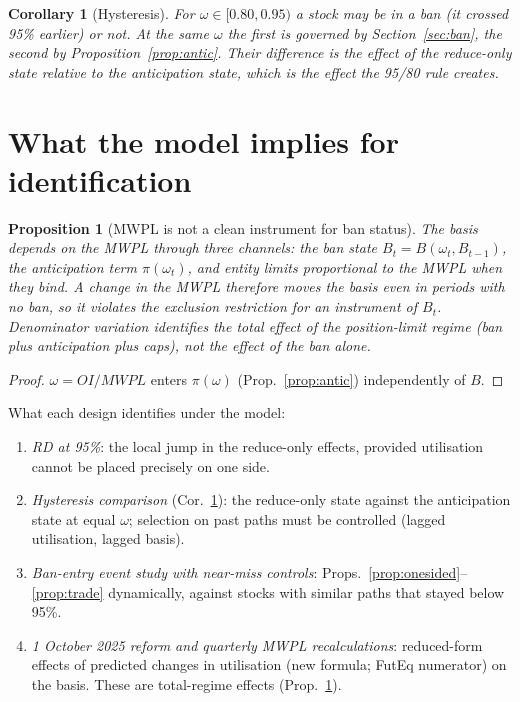 \documentclass[11pt,a4paper]{article}
\theoremstyle{plain}
\newtheorem{proposition}{Proposition}
\newtheorem{corollary}{Corollary}
\theoremstyle{definition}
\theoremstyle{remark}
\begin{document}
\begin{corollary}[Hysteresis]\label{cor:hyst}
For $\omega\in[0.80,0.95)$ a stock may be in a ban (it crossed 95\% earlier) or not. At the same $\omega$ the first is
governed by Section~\ref{sec:ban}, the second by Proposition~\ref{prop:antic}. Their difference is the effect of the
reduce-only state relative to the anticipation state, which is the effect the 95/80 rule creates.
\end{corollary}

\section{What the model implies for identification}\label{sec:id}
\begin{proposition}[MWPL is not a clean instrument for ban status]\label{prop:id}
The basis depends on the MWPL through three channels: the ban state $B_t=B(\omega_t,B_{t-1})$, the anticipation term
$\pi(\omega_t)$, and entity limits proportional to the MWPL when they bind. A change in the MWPL therefore moves the
basis even in periods with no ban, so it violates the exclusion restriction for an instrument of $B_t$. Denominator
variation identifies the \emph{total} effect of the position-limit regime (ban plus anticipation plus caps), not the effect
of the ban alone.
\end{proposition}
\begin{proof}
$\omega=OI/MWPL$ enters $\pi(\omega)$ (Prop.~\ref{prop:antic}) independently of $B$.
\end{proof}

What each design identifies under the model:
\begin{enumerate}[leftmargin=1.6em,itemsep=1pt]
\item \emph{RD at 95\%}: the local jump in the reduce-only effects, provided utilisation cannot be placed precisely on one side.
\item \emph{Hysteresis comparison} (Cor.~\ref{cor:hyst}): the reduce-only state against the anticipation state at equal $\omega$;
selection on past paths must be controlled (lagged utilisation, lagged basis).
\item \emph{Ban-entry event study with near-miss controls}: Props.~\ref{prop:onesided}--\ref{prop:trade} dynamically, against
stocks with similar paths that stayed below 95\%.
\item \emph{1 October 2025 reform and quarterly MWPL recalculations}: reduced-form effects of predicted changes in utilisation
(new formula; FutEq numerator) on the basis. These are total-regime effects (Prop.~\ref{prop:id}).
\end{enumerate}
\end{document}
